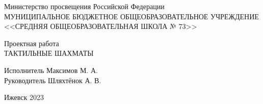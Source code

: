 \begin{titlepage}

    \begin{center}
        {\small
            Министерство просвещения Российской Федерации \\
            МУНИЦИПАЛЬНОЕ БЮДЖЕТНОЕ ОБЩЕОБРАЗОВАТЕЛЬНОЕ УЧРЕЖДЕНИЕ \\
            <<СРЕДНЯЯ ОБЩЕОБРАЗОВАТЕЛЬНАЯ ШКОЛА № 73>>
        }
    \end{center}

        \vspace{15.0em}

    \begin{center}

        {\LARGE
            Проектная работа\\
            ТАКТИЛЬНЫЕ ШАХМАТЫ \\
        }

        \vspace{13em}
        Исполнитель \hfill Максимов М. А. \\
        Руководитель \hfill Шляхтёнок А. В. \\
        \vspace{7em}

        {\small
            Ижевск 2023
        }

    \end{center}
\end{titlepage}
